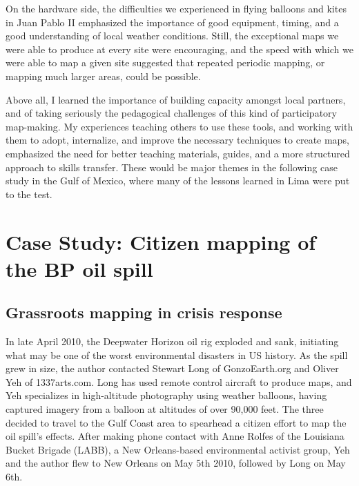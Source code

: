\documentclass[11pt]{report}
\begin{document}
On the hardware side, the difficulties we experienced in flying balloons and kites in Juan Pablo II emphasized the importance of good equipment, timing, and a good understanding of local weather conditions. Still, the exceptional maps we were able to produce at every site were encouraging, and the speed with which we were able to map a given site suggested that repeated periodic mapping, or mapping much larger areas, could be possible. 

Above all, I learned the importance of building capacity amongst local partners, and of taking seriously the pedagogical challenges of this kind of participatory map-making. My experiences teaching others to use these tools, and working with them to adopt, internalize, and improve the necessary techniques to create maps, emphasized the need for better teaching materials, guides, and a more structured approach to skills transfer. These would be major themes in the following case study in the Gulf of Mexico, where many of the lessons learned in Lima were put to the test. 

\chapter{Case Study: Citizen mapping of the BP oil spill}
\label{chap:gulf}

\section{Grassroots mapping in crisis response}

In late April 2010, the Deepwater Horizon oil rig exploded and sank, initiating what may be one of the worst environmental disasters in US history. As the spill grew in size, the author contacted Stewart Long of GonzoEarth.org and Oliver Yeh of 1337arts.com. Long has used remote control aircraft to produce maps, and Yeh specializes in high-altitude photography using weather balloons, having captured imagery from a balloon at altitudes of over 90,000 feet. The three decided to travel to the Gulf Coast area to spearhead a citizen effort to map the oil spill's effects. After making phone contact with Anne Rolfes of the Louisiana Bucket Brigade (LABB), a New Orleans-based environmental activist group, Yeh and the author flew to New Orleans on May 5th 2010, followed by Long on May 6th. 
\end{document}
